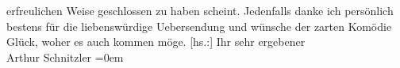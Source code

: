 \begin{ledgroupsized}[t]{13cm}
               erfreulichen Weise geschlossen zu haben scheint. Jedenfalls danke ich persönlich
               bestens für die liebenswürdige Uebersendung und wünsche der zarten Komödie Glück,
               woher es auch kommen möge.\pend
           \pstart
           {[}hs.:{]} Ihr sehr ergebener{\\[\baselineskip]}Arthur Schnitzler\pend
           \leftskip=0em{}\endnumbering{}\end{ledgroupsized}  \newcommand{\dateiname}{L01832}\newcommand{\titel}{Arthur Schnitzler an Robert Adam, 20. 3. 1909}\newcommand{\editorInnen}{Martin Anton Müller und Gerd-Hermann Susen}
      